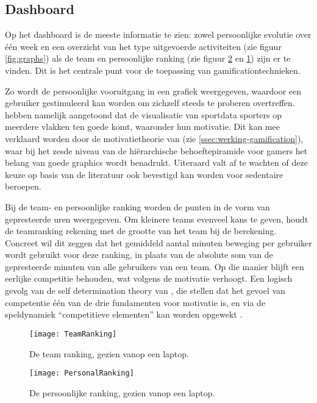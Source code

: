 \subsection{Dashboard}
Op het dashboard is de meeste informatie te zien: zowel persoonlijke evolutie over één week en een overzicht van het type uitgevoerde activiteiten (zie figuur \ref{fig:graphs}) als de team en persoonlijke ranking (zie figuur \ref{fig:personalRanking} en \ref{fig:teamRanking}) zijn er te vinden. Dit is het centrale punt voor de toepassing van gamificationtechnieken.

Zo wordt de persoonlijke vooruitgang in een grafiek weergegeven, waardoor een gebruiker gestimuleerd kan worden om zichzelf steeds te proberen overtreffen. \linebreak \textcite{Schiewe2020} hebben namelijk aangetoond dat de visualisatie van sportdata sporters op meerdere vlakken ten goede komt, waaronder hun motivatie. Dit kan mee verklaard worden door de motivatietheorie van \textcite{Siang2003} (zie \ref{ssec:werking-gamification}), waar bij het zesde niveau van de hiërarchische behoeftepiramide voor gamers het belang van goede graphics wordt benadrukt. Uiteraard valt af te wachten of deze keuze op basis van de literatuur ook bevestigd kan worden voor sedentaire beroepen.

Bij de team- en persoonlijke ranking worden de punten in de vorm van gepresteerde uren weergegeven. Om kleinere teams evenveel kans te geven, houdt de teamranking rekening met de grootte van het team bij de berekening. Concreet wil dit zeggen dat het gemiddeld aantal minuten beweging per gebruiker wordt gebruikt voor deze ranking, in plaats van de absolute som van de gepresteerde minuten van alle gebruikers van een team. Op die manier blijft een eerlijke competitie behouden, wat volgens \textcite{Ivanova2019} de motivatie verhoogt. Een logisch gevolg van de self determination theory van \textcite{Deci1985}, die stellen dat het gevoel van competentie één van de drie fundamenten voor motivatie is, en via de speldynamiek “competitieve elementen” kan worden opgewekt \autocite{Kam2018}.

\begin{figure}[h]
    \caption[Team ranking]{De team ranking, gezien vanop een laptop.}
    \texttt{[image: TeamRanking]}
    \label{fig:teamRanking}
\end{figure}

\begin{figure}[h]
    \caption[Persoonlijke ranking]{De persoonlijke ranking, gezien vanop een laptop.}
    \texttt{[image: PersonalRanking]}
    \label{fig:personalRanking}
\end{figure}

